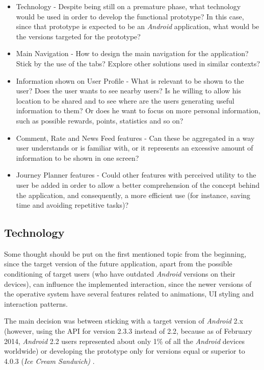 \begin{itemize}
\item Technology - Despite being still on a premature phase, what technology would be used in order to develop the functional prototype? In this case, since that prototype is expected to be an \emph{Android} application, what would be the versions targeted for the prototype?

\item Main Navigation - How to design the main navigation for the application? Stick by the use of the tabs? Explore other solutions used in similar contexts? 

\item Information shown on User Profile - What is relevant to be shown to the user? Does the user wants to see nearby users? Is he willing to allow his location to be shared and to see where are the users generating useful information to them? Or does he want to focus on more personal information, such as possible rewards, points, statistics and so on?

\item Comment, Rate and News Feed features - Can these be aggregated in a way user understands or is familiar with, or it represents an excessive amount of information to be shown in one screen? 

\item Journey Planner features - Could other features with perceived utility to the user be added in order to allow a better comprehension of the concept behind the application, and consequently, a more efficient use (for instance, saving time and avoiding repetitive tasks)?
\end{itemize}

\subsection{Technology}\label{technology}
Some thought should be put on the first mentioned topic from the beginning, since the target version of the future application, apart from the possible conditioning of target users (who have outdated \emph{Android} versions on their devices), can influence the implemented interaction, since the newer versions of the operative system have several features related to animations, UI styling and interaction patterns.

The main decision was between sticking with a target version of \emph{Android} 2.x (however, using the API for version 2.3.3 instead of 2.2, because as of February 2014, \emph{Android} 2.2 users represented about only 1\% of all the \emph{Android} devices worldwide) or developing the prototype only for versions equal or superior to 4.0.3 (\emph{Ice Cream Sandwich)} \cite{kn:Goo14}. 

